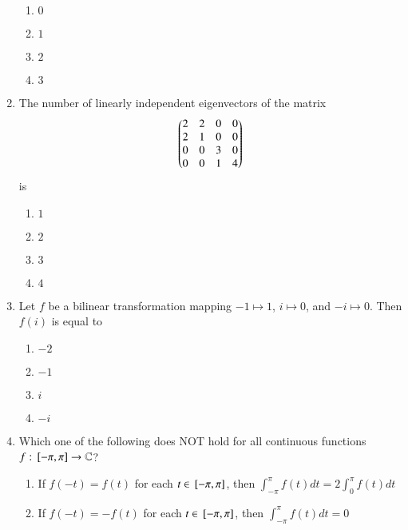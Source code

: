 \documentclass[journal,12pt,onecolumn]{IEEEtran}
\theoremstyle{remark}
\begin{document}
\begin{enumerate}
\begin{enumerate}[label=(\Alph*)]
\item \(0\)
\item \(1\)
\item \(2\)
\item \(3\)
\end{enumerate}

\item The number of linearly independent eigenvectors of the matrix
\[
\begin{pmatrix}
2 & 2 & 0 & 0\\
2 & 1 & 0 & 0\\
0 & 0 & 3 & 0\\
0 & 0 & 1 & 4
\end{pmatrix}
\]
is
\\[-0.3em]\makebox[\textwidth][r]{\textit{[GATE EE 2025]}}

\begin{enumerate}[label=(\Alph*)]
\item \(1\)
\item \(2\)
\item \(3\)
\item \(4\)
\end{enumerate}

\item Let \(f\) be a bilinear transformation mapping \(-1\mapsto 1\), \(i\mapsto 0\), and \(-i\mapsto 0\).  
Then \(f(i)\) is equal to
\\[-0.3em]\makebox[\textwidth][r]{\textit{[GATE EE 2025]}}

\begin{enumerate}[label=(\Alph*)]
\item \(-2\)
\item \(-1\)
\item \(i\)
\item \(-i\)
\end{enumerate}



\item Which one of the following does NOT hold for all continuous functions 
$f:{}\left[-\pi,\pi\right] \to \mathbb{C}$?
\\[-0.3em]\makebox[\textwidth][r]{\textit{[GATE EE 2025]}}

\begin{enumerate}[label=(\Alph*)]
\item If $f(-t) = f(t)$ for each $t \in {}\left[-\pi,\pi\right]$, then 
$\int_{-\pi}^\pi f(t)dt = 2\int_{0}^\pi f(t)dt$

\item If $f(-t) = -f(t)$ for each $t \in {}\left[-\pi,\pi\right]$, then 
$\int_{-\pi}^\pi f(t)dt = 0$


\end{enumerate}
\end{enumerate}
\end{document}

